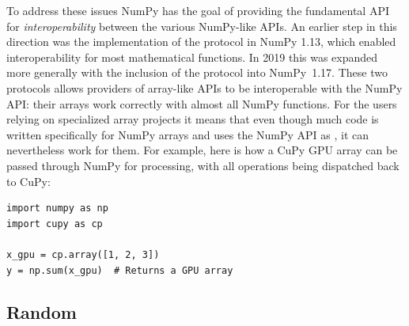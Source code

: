 To address these issues NumPy has the goal of providing the fundamental
API for \emph{interoperability} between the various NumPy-like APIs.
An earlier step in this direction was the implementation of the
 protocol in NumPy 1.13, which enabled interoperability
for most mathematical functions.\cite{NEP13}
In 2019 this was expanded more generally with the inclusion of the
 protocol into NumPy~1.17.
These two protocols allows providers of array-like APIs to be interoperable
with the NumPy API: their arrays work correctly with almost all NumPy functions.\cite{NEP18}
For the users relying on specialized array projects it means that even though
much code is written specifically for NumPy arrays and uses the NumPy API as
, it can nevertheless work for them.  For
example, here is how a CuPy GPU array can be passed through NumPy for
processing, with all operations being dispatched back to CuPy:

\begin{lstlisting}
import numpy as np
import cupy as cp

x_gpu = cp.array([1, 2, 3])
y = np.sum(x_gpu)  # Returns a GPU array
\end{lstlisting}

%
%
%
%
%
%
%

\subsection{Random}


